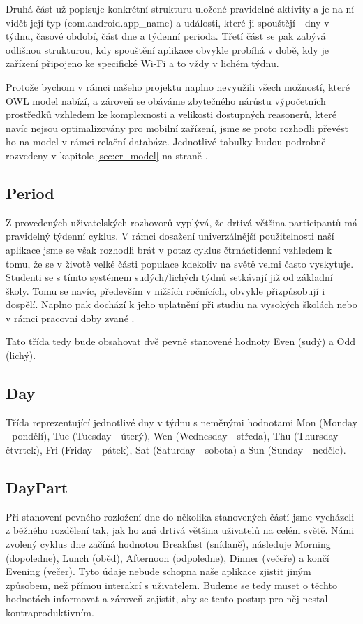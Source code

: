 \documentclass[thesis=M,czech]{FITthesis}[2012/06/26]
\begin{document}
Druhá část už popisuje konkrétní strukturu uložené pravidelné aktivity a je na ní vidět její typ (com.android.app\_name) a události, které ji spouštějí - dny v týdnu, časové období, část dne a týdenní perioda. Třetí část se pak zabývá odlišnou strukturou, kdy spouštění aplikace obvykle probíhá v době, kdy je zařízení připojeno ke specifické Wi-Fi a to vždy v lichém týdnu.

Protože bychom v rámci našeho projektu naplno nevyužili všech možností, které OWL model nabízí, a zároveň se obáváme zbytečného nárůstu výpočetních prostředků vzhledem ke komplexnosti a velikosti dostupných reasonerů, které navíc nejsou optimalizovány pro mobilní zařízení, jsme se proto rozhodli převést ho na model v rámci relační databáze. Jednotlivé tabulky budou podrobně rozvedeny v kapitole \ref{sec:er_model} na straně \pageref{sec:er_model}.

\subsection{Period}
Z provedených uživatelských rozhovorů vyplývá, že drtivá většina participantů má pravidelný týdenní cyklus. V rámci dosažení univerzálnější použitelnosti naší aplikace jsme se však rozhodli brát v potaz cyklus čtrnáctidenní vzhledem k tomu, že se v životě velké části populace kdekoliv na světě velmi často vyskytuje. Studenti se s tímto systémem sudých/lichých týdnů setkávají již od základní školy. Tomu se navíc, především v nižších ročnících, obvykle přizpůsobují i dospělí. Naplno pak dochází k jeho uplatnění při studiu na vysokých školách nebo v rámci pracovní doby zvané .

Tato třída tedy bude obsahovat dvě pevně stanovené hodnoty Even (sudý) a Odd (lichý).

\subsection{Day}
Třída reprezentující jednotlivé dny v týdnu s neměnými hodnotami Mon (Monday - pondělí), Tue (Tuesday - úterý), Wen (Wednesday - středa), Thu (Thursday - čtvrtek), Fri (Friday - pátek), Sat (Saturday - sobota) a Sun (Sunday - neděle).

\subsection{DayPart}
Při stanovení pevného rozložení dne do několika stanovených částí jsme vycházeli z běžného rozdělení tak, jak ho zná drtivá většina uživatelů na celém světě. Námi zvolený cyklus dne začíná hodnotou Breakfast (snídaně), následuje Morning (dopoledne), Lunch (oběd), Afternoon (odpoledne), Dinner (večeře) a končí Evening (večer). Tyto údaje nebude schopna naše aplikace zjistit jiným způsobem, než přímou interakcí s uživatelem. Budeme se tedy muset o těchto hodnotách informovat a zároveň zajistit, aby se tento postup pro něj nestal kontraproduktivním.
\end{document}
